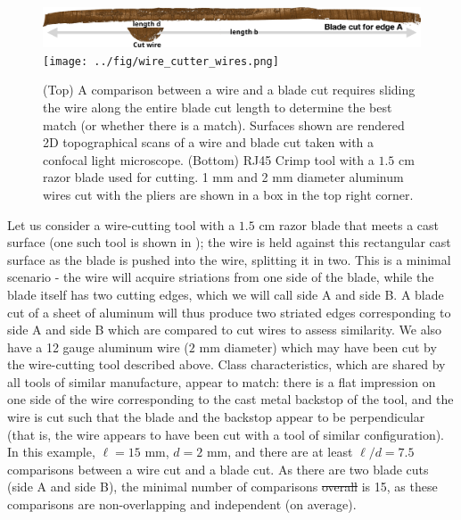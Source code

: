 \documentclass[9pt,twocolumn,twoside]{pnas-new}\usepackage[]{graphicx}\usepackage[dvipsnames]{xcolor}
\providecommand{\DIFadd}[1]{{\protect\color{blue}\uwave{#1}}} %
\providecommand{\DIFdel}[1]{{\protect\color{red}\sout{#1}}}                      %
\providecommand{\DIFaddbegin}{} %
\providecommand{\DIFaddend}{} %
\providecommand{\DIFdelbegin}{} %
\providecommand{\DIFdelend}{} %
\newcommand{\DIFscaledelfig}{0.5}
\newlength{\DIFdelgraphicswidth} %
\newlength{\DIFdelgraphicsheight} %
\newcommand{\DIFaddincludegraphics}[2][]{{\color{blue}\fbox{\DIFOincludegraphics[#1]{#2}}}} %
\newcommand{\DIFdelincludegraphics}[2][]{%
\sbox{\DIFdelgraphicsbox}{\DIFOincludegraphics[#1]{#2}}%
\settoboxwidth{\DIFdelgraphicswidth}{\DIFdelgraphicsbox} %
\settoboxtotalheight{\DIFdelgraphicsheight}{\DIFdelgraphicsbox} %
\scalebox{\DIFscaledelfig}{%
\parbox[b]{\DIFdelgraphicswidth}{\usebox{\DIFdelgraphicsbox}\\[-\baselineskip] \rule{\DIFdelgraphicswidth}{0em}}\llap{\resizebox{\DIFdelgraphicswidth}{\DIFdelgraphicsheight}{%
\setlength{\unitlength}{\DIFdelgraphicswidth}%
\begin{picture}(1,1)%
\thicklines\linethickness{2pt} %
{\color[rgb]{1,0,0}\put(0,0){\framebox(1,1){}}}%
{\color[rgb]{1,0,0}\put(0,0){\line( 1,1){1}}}%
{\color[rgb]{1,0,0}\put(0,1){\line(1,-1){1}}}%
\end{picture}%
}\hspace*{3pt}}} %
} %
\DeclareRobustCommand{\DIFaddbegin}{\DIFOaddbegin \let\includegraphics\DIFaddincludegraphics} %
\DeclareRobustCommand{\DIFaddend}{\DIFOaddend \let\includegraphics\DIFOincludegraphics} %
\DeclareRobustCommand{\DIFdelbegin}{\DIFOdelbegin \let\includegraphics\DIFdelincludegraphics} %
\DeclareRobustCommand{\DIFdelend}{\DIFOaddend \let\includegraphics\DIFOincludegraphics} %
\begin{document}
\begin{figure}[t!]
\centering
\includegraphics[width=\columnwidth]{../fig/wire-blade-comparison-label.png}
\texttt{[image: ../fig/wire\_cutter\_wires.png]}
\caption{(Top) A comparison between a wire and a blade cut requires sliding the wire along the entire blade cut length to determine the best match (or whether there is a match). Surfaces shown are rendered 2D topographical scans of a wire and blade cut taken with a confocal light microscope. (Bottom) RJ45 Crimp tool with a $1.5$ cm razor blade used for cutting. 1 mm and 2 mm diameter aluminum wires cut with the pliers are shown in a box in the top right corner.}\label{fig:tool-pic}\label{fig:wire-blade}
\end{figure}

Let us consider a wire-cutting tool with a $1.5$ cm razor blade that meets a cast surface (one such tool is shown in ); the wire is held against this rectangular cast surface as the blade is pushed into the wire, splitting it in two.
This is a minimal scenario - the wire will acquire striations from one side of the blade, while the blade itself has two cutting edges, which we will call side A and side B.
A blade cut of a sheet of aluminum will thus produce two striated edges corresponding to side A and side B which are compared to cut wires to assess similarity.
We also have a 12 gauge aluminum wire ($2$ mm diameter) which may have been cut by the wire-cutting tool described above.
Class characteristics, which are shared by all tools of similar manufacture, appear to match:
there is a flat impression on one side of the wire corresponding to the cast metal backstop of the tool,
and the wire is cut such that the blade and the backstop appear to be perpendicular
(that is, the wire appears to have been cut with a tool of similar configuration).
In this example, \DIFdelbegin \DIFdel{$\ell = 15$ }\DIFdelend \DIFaddbegin \DIFadd{$b = 15$ }\DIFaddend mm, $d = 2$ mm, and there are at least \DIFdelbegin \DIFdel{$\ell/d = 7.5$ }\DIFdelend \DIFaddbegin \DIFadd{$b/d = 7.5$ }\DIFaddend comparisons between a wire cut and a blade cut.
As there are two blade cuts (side A and side B), the minimal number of comparisons \DIFdelbegin \DIFdel{overall }\DIFdelend is 15, as these comparisons are non-overlapping and independent (on average).
\end{document}
